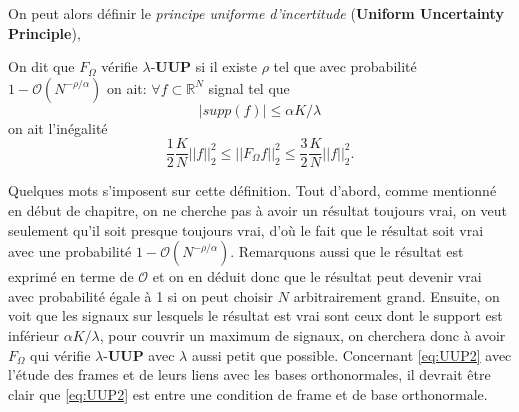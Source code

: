 On peut alors définir le \emph{principe uniforme d'incertitude} (\textbf{Uniform Uncertainty Principle}), 
\begin{definition}
	On dit que $F_\Omega$ vérifie $\lambda$-\textbf{UUP} si il existe $\rho$ tel que avec probabilité $1 - \mathcal{O}(N^{-\rho / \alpha})$ on ait:
	\newline
	$\forall f \subset \mathbb{R}^N$ signal tel que 
	\begin{equation}\label{eq:UUP1}
		|supp(f)| \leq \alpha K /\lambda
	\end{equation}
	on ait l'inégalité
	\begin{equation}\label{eq:UUP2}
		\frac{1}{2}\frac{K}{N} ||f||_2^2\leq ||F_\Omega f||_2^2 \leq \frac{3}{2} \frac{K}{N} ||f||_2^2.
	\end{equation}
\end{definition}
Quelques mots s'imposent sur cette définition. 
Tout d'abord, comme mentionné en début de chapitre, on ne cherche pas à avoir un résultat toujours vrai, on veut seulement qu'il soit presque toujours vrai, d'où le fait que le résultat soit vrai avec une probabilité $1-\mathcal{O}(N^{-\rho/\alpha})$.
Remarquons aussi que le résultat est exprimé en terme de $\mathcal{O}$ et on en déduit donc que le résultat peut devenir vrai avec probabilité égale à 1 si on peut choisir $N$ arbitrairement grand.
\newline
Ensuite, on voit que les signaux sur lesquels le résultat est vrai sont ceux dont le support est inférieur $\alpha K /\lambda$, pour couvrir un maximum de signaux, on cherchera donc à avoir $F_\Omega$ qui vérifie $\lambda$-\textbf{UUP} avec $\lambda$ aussi petit que possible.
\newline
Concernant \ref{eq:UUP2} avec l'étude des frames et de leurs liens avec les bases orthonormales, il devrait être clair que \ref{eq:UUP2} est entre une condition de frame et de base orthonormale.

